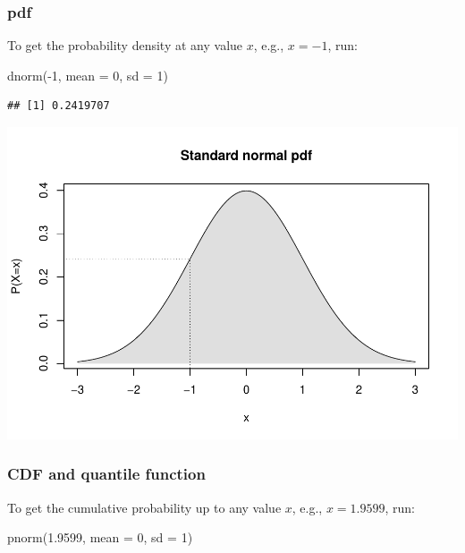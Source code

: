 \documentclass[
  11pt,
]{article}
\newenvironment{Shaded}{\begin{snugshade}}{\end{snugshade}}
\newcommand{\AttributeTok}[1]{\textcolor[rgb]{0.77,0.63,0.00}{#1}}
\newcommand{\DecValTok}[1]{\textcolor[rgb]{0.00,0.00,0.81}{#1}}
\newcommand{\FloatTok}[1]{\textcolor[rgb]{0.00,0.00,0.81}{#1}}
\newcommand{\FunctionTok}[1]{\textcolor[rgb]{0.00,0.00,0.00}{#1}}
\newcommand{\NormalTok}[1]{#1}
\newcommand{\SpecialCharTok}[1]{\textcolor[rgb]{0.00,0.00,0.00}{#1}}
\begin{document}
\hypertarget{pdf}{%
\subsubsection{pdf}\label{pdf}}

To get the probability density at any value \(x\), e.g., \(x = -1\), run:

\begin{Shaded}
\begin{Highlighting}[]
\FunctionTok{dnorm}\NormalTok{(}\SpecialCharTok{{-}}\DecValTok{1}\NormalTok{, }\AttributeTok{mean =} \DecValTok{0}\NormalTok{, }\AttributeTok{sd =} \DecValTok{1}\NormalTok{)}
\end{Highlighting}
\end{Shaded}

\begin{verbatim}
## [1] 0.2419707
\end{verbatim}

\begin{center}\includegraphics{01-lec-short_files/figure-latex/stdnorm-3-1} \end{center}

\hypertarget{cdf-and-quantile-function}{%
\subsubsection{CDF and quantile function}\label{cdf-and-quantile-function}}

To get the cumulative probability up to any value \(x\), e.g., \(x = 1.9599\), run:

\begin{Shaded}
\begin{Highlighting}[]
\FunctionTok{pnorm}\NormalTok{(}\FloatTok{1.9599}\NormalTok{, }\AttributeTok{mean =} \DecValTok{0}\NormalTok{, }\AttributeTok{sd =} \DecValTok{1}\NormalTok{)}
\end{Highlighting}
\end{Shaded}
\end{document}
